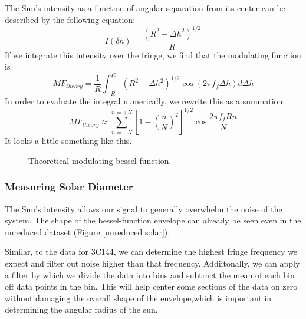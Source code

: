 \documentclass[12pt]{article}
\begin{document}
The Sun's intensity as a function of angular separation from its center can be described by the following equation:
\begin{equation}
I(\delta h ) = \frac{(R^2 - \Delta{h}^2)^{1/2}}{R}
\end{equation}
If we integrate this intensity over the fringe, we find that the modulating function is
\begin{equation}
MF_{theory} = \frac{1}{R} \int_{-R}^{R} (R^2 - \Delta{h}^2)^{1/2} \cos{(2\pi f_f \Delta{h})} d\Delta{h}
\end{equation}
In order to evaluate the integral numerically, we rewrite this as a summation:
\begin{equation}
MF_{theory} \approx \sum_{n=-N}^{n=+N} \left[ 1- \left( \frac{n}{N} \right) ^2 \right]^{1/2} \cos{\frac{2\pi f_f R n}{N}}
\end{equation}  
It looks a little something like this.

\begin{figure}[H]
\caption[SODUMB]{Theoretical modulating bessel function.}
\label{fig:MF}
\end{figure}

\subsubsection{Measuring Solar Diameter}
The Sun's intensity allows our signal to generally overwhelm the noise of the system. The shape of the bessel-function envelope can already be seen even in the unreduced dataset (Figure [unreduced solar]).

Similar, to the data for 3C144, we can determine the highest fringe frequency we expect and filter out noise higher than that frequency. Addiitonally, we can apply a filter by which we divide the data into bins and subtract the mean of each bin off data points in the bin. This will help center some sections of the data on zero without damaging the overall shape of the envelope,which is important in determining the angular radius of the sun. 
\end{document}

